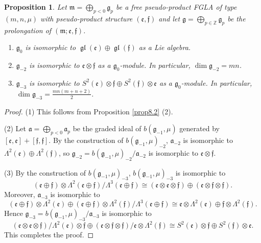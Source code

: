 \documentclass[11pt]{article}
\newtheorem{proposition}{Proposition}
\numberwithin{equation}{section}
\numberwithin{theorem}{section}
\numberwithin{proposition}{section}
\numberwithin{lemma}{section}
\numberwithin{corollary}{section}
\numberwithin{definition}{section}
\numberwithin{example}{section}
\numberwithin{remark}{section}
\numberwithin{note}{section}
\newcommand{\gl}{\operatorname{\mathfrak{gl}}}
\newcommand{\gla}[1]{\mathfrak#1=\bigoplus\limits_{p\in\mathbb Z}\mathfrak#1_p} \renewcommand{\labelenumi}{{\rm (\arabic{enumi})}}
\begin{document}
\begin{proposition}\label{prop8.3} Let $\mathfrak m=\bigoplus\limits_{p<0}\mathfrak g_p$ be a
free pseudo-product FGLA of type $(m,n,\mu)$
with pseudo-product structure $(\mathfrak e,\mathfrak f)$
and let
$\gla g$ be the prolongation of $(\mathfrak m;\mathfrak e,\mathfrak f)$.
\begin{enumerate}\itemsep=0pt
\item
$\mathfrak g_0$ is isomorphic to $\gl(\mathfrak e)\oplus\gl(\mathfrak f)$ as
a Lie algebra.
\item $\mathfrak g_{-2}$ is isomorphic to $\mathfrak e\otimes \mathfrak f$
as a $\mathfrak g_0$-module. In particular,
$\dim\mathfrak g_{-2}=mn$.
\item $\mathfrak g_{-3}$ is isomorphic to
$S^2(\mathfrak e)\otimes
\mathfrak f\oplus S^2(\mathfrak f)\otimes \mathfrak e$
as a $\mathfrak g_0$-module.
In particular,
$\dim\mathfrak g_{-3}=\frac{mn(m+n+2)}2$.
\end{enumerate}
\end{proposition}

\begin{proof} (1) This follows from Proposition \ref{prop8.2} (2).
\par
(2) Let $\mathfrak a=\bigoplus\limits_{p<0}\mathfrak a_p$ be the graded ideal
of $b(\mathfrak g_{-1},\mu)$ generated by
$[\mathfrak e,\mathfrak e]+[\mathfrak f,\mathfrak f]$.
By the construction of $b(\mathfrak g_{-1},\mu)_{-2}$,
$\mathfrak a_{-2}$ is isomorphic to $\Lambda^2(\mathfrak e)\oplus
\Lambda^2(\mathfrak f)$, so
$\mathfrak g_{-2}=b(\mathfrak g_{-1},\mu)_{-2}/\mathfrak a_{-2}$
is isomorphic to $\mathfrak e\otimes \mathfrak f$.

(3) By the construction of $b(\mathfrak g_{-1},\mu)_{-3}$,
$b(\mathfrak g_{-1},\mu)_{-3}$ is isomorphic to
\[
(\mathfrak e\oplus \mathfrak f)\otimes \Lambda^2(\mathfrak e\oplus \mathfrak f)/\Lambda^3(\mathfrak e\oplus \mathfrak f)\cong
(\mathfrak e\otimes \mathfrak e\otimes \mathfrak f)
\oplus
(\mathfrak e\otimes \mathfrak f\otimes \mathfrak f).
\]
Moreover,
$\mathfrak a_{-3}$ is isomorphic to
\[
(\mathfrak e\oplus \mathfrak f)\otimes \Lambda^2(\mathfrak e)
\oplus(\mathfrak e\oplus \mathfrak f)\otimes \Lambda^2(\mathfrak f)/
\Lambda^3(\mathfrak e\oplus \mathfrak f)
\cong \mathfrak e\otimes\Lambda^2(\mathfrak e)\oplus
\mathfrak f\otimes\Lambda^2(\mathfrak f).
\]
Hence
$\mathfrak g_{-3}=b(\mathfrak g_{-1},\mu)_{-3}/\mathfrak a_{-3}$
is isomorphic to
\[
(\mathfrak e\otimes \mathfrak e\otimes \mathfrak f)/
\Lambda^2(\mathfrak e)\otimes\mathfrak f\oplus
(\mathfrak e\otimes \mathfrak f\otimes \mathfrak f)/
\mathfrak e\otimes\Lambda^2(\mathfrak f)
\cong
S^2(\mathfrak e)\otimes
\mathfrak f\oplus S^2(\mathfrak f)\otimes \mathfrak e.
\]
This completes the proof.
\end{proof}
\end{document}
